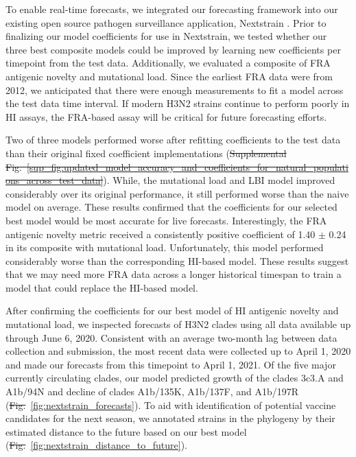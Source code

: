 \documentclass[9pt,lineno]{elife} %
\providecommand{\DIFadd}[1]{{\protect\color{blue}\uwave{#1}}} %
\providecommand{\DIFdel}[1]{{\protect\color{red}\sout{#1}}}                      %
\providecommand{\DIFaddbegin}{} %
\providecommand{\DIFaddend}{} %
\providecommand{\DIFdelbegin}{} %
\providecommand{\DIFdelend}{} %
\providecommand{\DIFaddtex}[1]{{\protect\color{blue}\uwave{#1}}} %
\providecommand{\DIFdeltex}[1]{{\protect\color{red}\sout{#1}}}                      %
\providecommand{\DIFaddbegin}{} %
\providecommand{\DIFaddend}{} %
\providecommand{\DIFdelbegin}{} %
\providecommand{\DIFdelend}{} %
\providecommand{\DIFadd}[1]{\texorpdfstring{\DIFaddtex{#1}}{#1}} %
\providecommand{\DIFdel}[1]{\texorpdfstring{\DIFdeltex{#1}}{}} %
\newcommand{\DIFscaledelfig}{0.5}
\newlength{\DIFdelgraphicswidth} %
\newlength{\DIFdelgraphicsheight} %
\newcommand{\DIFaddincludegraphics}[2][]{{\color{blue}\fbox{\DIFOincludegraphics[#1]{#2}}}} %
\newcommand{\DIFdelincludegraphics}[2][]{%
\sbox{\DIFdelgraphicsbox}{\DIFOincludegraphics[#1]{#2}}%
\settoboxwidth{\DIFdelgraphicswidth}{\DIFdelgraphicsbox} %
\settoboxtotalheight{\DIFdelgraphicsheight}{\DIFdelgraphicsbox} %
\scalebox{\DIFscaledelfig}{%
\parbox[b]{\DIFdelgraphicswidth}{\usebox{\DIFdelgraphicsbox}\\[-\baselineskip] \rule{\DIFdelgraphicswidth}{0em}}\llap{\resizebox{\DIFdelgraphicswidth}{\DIFdelgraphicsheight}{%
\setlength{\unitlength}{\DIFdelgraphicswidth}%
\begin{picture}(1,1)%
\thicklines\linethickness{2pt} %
{\color[rgb]{1,0,0}\put(0,0){\framebox(1,1){}}}%
{\color[rgb]{1,0,0}\put(0,0){\line( 1,1){1}}}%
{\color[rgb]{1,0,0}\put(0,1){\line(1,-1){1}}}%
\end{picture}%
}\hspace*{3pt}}} %
} %
\DeclareRobustCommand{\DIFaddbegin}{\DIFOaddbegin \let\includegraphics\DIFaddincludegraphics} %
\DeclareRobustCommand{\DIFaddend}{\DIFOaddend \let\includegraphics\DIFOincludegraphics} %
\DeclareRobustCommand{\DIFdelbegin}{\DIFOdelbegin \let\includegraphics\DIFdelincludegraphics} %
\DeclareRobustCommand{\DIFdelend}{\DIFOaddend \let\includegraphics\DIFOincludegraphics} %
\begin{document}
To enable real-time forecasts, we integrated our forecasting framework into our existing open source pathogen surveillance application, Nextstrain \DIFdelbegin %
\DIFdelend \DIFaddbegin \citep{Hadfield2018}\DIFaddend .
Prior to finalizing our model coefficients for use in Nextstrain, we tested whether our three best composite models could be improved by learning new coefficients per timepoint from the test data.
Additionally, we evaluated a composite of FRA antigenic novelty and mutational load.
Since the earliest FRA data were from 2012, we anticipated that there were enough measurements to fit a model across the test data time interval.
If modern H3N2 strains continue to perform poorly in HI assays, the FRA-based assay will be critical for future forecasting efforts.

Two of three models performed worse after refitting coefficients to the test data than their original fixed coefficient implementations (\DIFdelbegin \DIFdel{Supplemental Fig.~\ref{sup_fig:updated_model_accuracy_and_coefficients_for_natural_populations_across_test_data}}\DIFdelend \DIFaddbegin \DIFadd{Figure~\ref{fig:unadjusted_composite_model_accuracy_and_coefficients_for_natural_populations}-Figure supplement~\ref{figsupp:updated_model_accuracy_and_coefficients_for_natural_populations_across_test_data}}\DIFaddend ).
While, the mutational load and LBI model improved considerably over its original performance, it still performed worse than the naive model on average.
These results confirmed that the coefficients for our selected best model would be most accurate for live forecasts.
Interestingly, the FRA antigenic novelty metric received a consistently positive coefficient of 1.40 $\pm$ 0.24 in its composite with mutational load.
Unfortunately, this model performed considerably worse than the corresponding HI-based model.
These results suggest that we may need more FRA data across a longer historical timespan to train a model that could replace the HI-based model.

After confirming the coefficients for our best model of HI antigenic novelty and mutational load, we inspected forecasts of H3N2 clades using all data available up through June 6, 2020.
Consistent with an average two-month lag between data collection and submission, the most recent data were collected up to April 1, 2020 and made our forecasts from this timepoint to April 1, 2021.
Of the five major currently circulating clades, our model predicted growth of the clades 3c3.A and A1b/94N and decline of clades A1b/135K, A1b/137F, and A1b/197R (\DIFdelbegin \DIFdel{Fig.}\DIFdelend \DIFaddbegin \DIFadd{Figure}\DIFaddend ~\ref{fig:nextstrain_forecasts}).
To aid with identification of potential vaccine candidates for the next season, we annotated strains in the phylogeny by their estimated distance to the future based on our best model (\DIFdelbegin \DIFdel{Fig.}\DIFdelend \DIFaddbegin \DIFadd{Figure}\DIFaddend ~\ref{fig:nextstrain_distance_to_future}).
\end{document}
